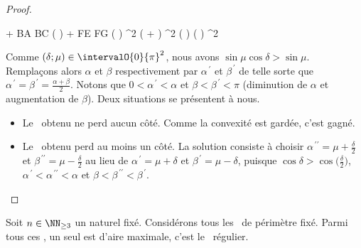 \begin{proof}
	\medskip	
	\begin{stepcalc}[style=ar*]
		 + 
		 BA \cdot BC \cdot \sin \big(  \big)
		+
		 FE \cdot FG \cdot \sin \big(  \big)
	\explnext{}
		 \ell^2 ( \sin \alpha + \sin \beta )
		 \ell^2 \sin \big(  \big) \cos \big(  \big)
	\explnext{}
		 \ell^2 \sin \mu \cos \delta
	\end{stepcalc}
	
	
	\medskip
	
	Comme $(\delta ; \mu) \in \intervalO{0}{\pi}^2$,
	nous avons $\sin \mu \cos \delta > \sin \mu$.
	Remplaçons alors $\alpha$ et $\beta$ respectivement par $\alpha^{\,\prime}$ et $\beta^{\,\prime}$ de telle sorte que $\alpha^{\,\prime} = \beta^{\,\prime} = \frac{\alpha + \beta}{2}$.
	Notons que 
	$0 < \alpha^{\,\prime} < \alpha$ et 
	$\beta < \beta^{\,\prime} < \pi$ 
	(diminution de $\alpha$ et augmentation de $\beta$).
	Deux situations se présentent à nous.
	\begin{itemize}
		\item Le \ngone\ obtenu ne perd aucun côté.
		Comme la convexité est gardée, c'est gagné.


		\item Le \ngone\ obtenu perd au moins un côté. La solution consiste à choisir
		$\alpha^{\,\prime\prime} = \mu + \frac{\delta}{2}$ et $\beta^{\,\prime\prime} = \mu - \frac{\delta}{2}$
		au lieu de
		$\alpha^{\,\prime} = \mu + \delta$ et $\beta^{\,\prime} = \mu - \delta$, puisque 
		$\cos \delta > \cos \big( \frac{\delta}{2} \big)$,
		$\alpha^{\,\prime} < \alpha^{\,\prime\prime} < \alpha$ et 
		$\beta < \beta^{\,\prime\prime} < \beta^{\,\prime}$.
	\end{itemize}
\end{proof}




\begin{fact}
	Soit $n \in \NN_{\geq3}$ un naturel fixé.
	Considérons tous les \ngones\  de périmètre fixé. Parmi tous ces \ngones, un seul est d'aire maximale, c'est le \ngone\ régulier.
\end{fact}


